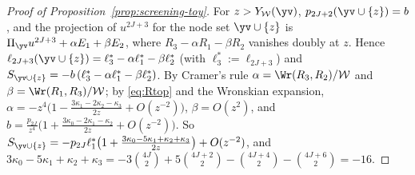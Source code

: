 \begin{proof}[Proof of Proposition~\textup{\ref{prop:screening-toy}}]
For $z>Y_{\mathcal W}(\yv)$, $p_{2J+2}(\yv\cup\{z\})=b$, and the projection of $u^{2J+3}$ for the node set
$\yv\cup\{z\}$ is $\Pi_{\yv}u^{2J+3}+\alpha E_1+\beta E_2$, where $R_3-\alpha R_1-\beta R_2$ vanishes doubly at $z$.
Hence $\ell_{2J+3}(\yv\cup\{z\})=\ell_3^*-\alpha\ell_1^*-\beta\ell_2^*$ (with $\ell_3^*:=\ell_{2J+3}$) and
$S_{\yv\cup\{z\}}=-b\,(\ell_3^*-\alpha\ell_1^*-\beta\ell_2^*)$. By Cramer's rule $\alpha=\Wr(R_3,R_2)/\mathcal W$ and
$\beta=\Wr(R_1,R_3)/\mathcal W$; by \eqref{eq:Rtop} and the Wronskian expansion,
$\alpha=-z^4\bigl(1-\frac{3\kappa_1-2\kappa_2-\kappa_3}{2z}+O(z^{-2})\bigr)$, $\beta=O(z^2)$, and
$b=\frac{p_{2J}}{z^4}\bigl(1+\frac{3\kappa_0-2\kappa_1-\kappa_2}{2z}+O(z^{-2})\bigr)$. So
$S_{\yv\cup\{z\}}=-p_{2J}\ell_1^*\bigl(1+\frac{3\kappa_0-5\kappa_1+\kappa_2+\kappa_3}{2z}\bigr)+O(z^{-2})$, and
$3\kappa_0-5\kappa_1+\kappa_2+\kappa_3=-3\binom{4J}2+5\binom{4J+2}2-\binom{4J+4}2-\binom{4J+6}2=-16$.
\end{proof}

